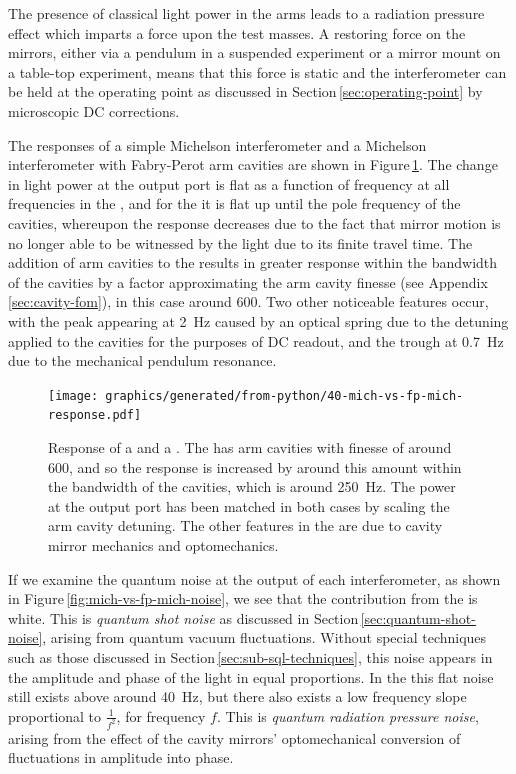 The presence of classical light power in the arms leads to a radiation pressure effect which imparts a force upon the test masses. A restoring force on the mirrors, either via a pendulum in a suspended experiment or a mirror mount on a table-top experiment, means that this force is static and the interferometer can be held at the operating point as discussed in Section\,\ref{sec:operating-point} by microscopic \gls{DC} corrections.

The responses of a simple Michelson interferometer and a Michelson interferometer with Fabry-Perot arm cavities are shown in Figure\,\ref{fig:mich-vs-fp-mich-response}. The change in light power at the output port is flat as a function of frequency at all frequencies in the \MI{}, and for the \FPMI{} it is flat up until the pole frequency of the \FP{} cavities, whereupon the response decreases due to the fact that mirror motion is no longer able to be witnessed by the light due to its finite travel time. The addition of arm cavities to the \MI{} results in greater response within the bandwidth of the cavities by a factor approximating the arm cavity finesse (see Appendix\,\ref{sec:cavity-fom}), in this case around \num{600}. Two other noticeable features occur, with the peak appearing at \SI{2}{\hertz} caused by an optical spring due to the detuning applied to the cavities for the purposes of \gls{DC} readout, and the trough at \SI{0.7}{\hertz} due to the mechanical pendulum resonance.

\begin{figure}
  \centering
  \texttt{[image: graphics/generated/from-python/40-mich-vs-fp-mich-response.pdf]}
  \caption[Response of a Michelson and Fabry-Perot Michelson]{\label{fig:mich-vs-fp-mich-response}Response of a \MI{} and a \FPMI{}. The \FPMI{} has arm cavities with finesse of around \num{600}, and so the response is increased by around this amount within the bandwidth of the cavities, which is around \SI{250}{\hertz}. The power at the output port has been matched in both cases by scaling the arm cavity detuning. The other features in the \FPMI{} are due to cavity mirror mechanics and optomechanics.}
\end{figure}

If we examine the quantum noise at the output of each interferometer, as shown in Figure\,\ref{fig:mich-vs-fp-mich-noise}, we see that the contribution from the \MI{} is white. This is \emph{quantum shot noise} as discussed in Section\,\ref{sec:quantum-shot-noise}, arising from quantum vacuum fluctuations. Without special techniques such as those discussed in Section\,\ref{sec:sub-sql-techniques}, this noise appears in the amplitude and phase of the light in equal proportions. In the \FPMI{} this flat noise still exists above around \SI{40}{\hertz}, but there also exists a low frequency slope proportional to $\frac{1}{f^2}$, for frequency $f$. This is \emph{quantum radiation pressure noise}, arising from the effect of the cavity mirrors' optomechanical conversion of fluctuations in amplitude into phase.

